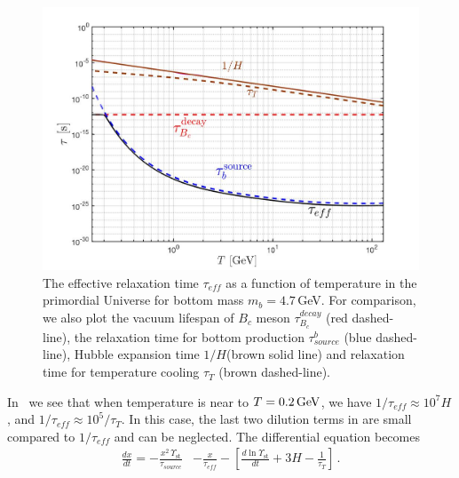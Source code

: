 \begin{figure} 
\centerline{\includegraphics[width=0.8\linewidth]{./plots/Tau_RelaxationTime002}}
\caption{The effective relaxation time $\tau_{eff}$ as a function of temperature in the primordial Universe for bottom mass $m_b=4.7$\,GeV. For comparison, we also plot the vacuum lifespan of $B_c$ meson $\tau_{B_c}^{decay}$ (red dashed-line), the relaxation time for bottom production $\tau^b_{source}$ (blue dashed-line), Hubble expansion time $1/H$(brown solid line) and relaxation time for temperature cooling $\tau_T$ (brown dashed-line). }
\label{RelaxationTime_eff}
\end{figure}

In~ we see that when temperature is near to $T=0.2\text{\,GeV}$, we have $1/\tau_{eff}\approx10^{7}H$, and $1/\tau_{eff}\approx10^5/\tau_T$. In this case, the last two dilution terms in   are small compared to $1/\tau_{eff}$ and can be neglected. The differential equation becomes
\begin{align}\label{nonstationary_eq}
\frac{dx}{dt}=-\frac{x^2\,\Upsilon_\mathrm{st}}{\tau_{source}}&-\frac{x}{\tau_{eff}}-\left[\frac{d\ln\Upsilon_\mathrm{st}}{dt}+3H-\frac{1}{\tau_T}\right]
\,.
\end{align}

